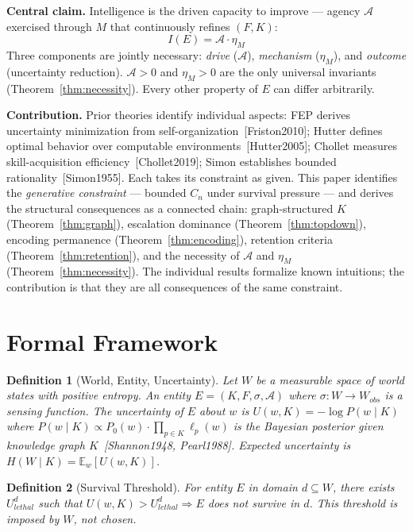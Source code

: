 \documentclass[11pt]{article}
\newtheorem{definition}{Definition}
\begin{document}
\textbf{Central claim.} Intelligence is the driven capacity to improve --- agency $\mathcal{A}$ exercised through $M$ that continuously refines $(F, K)$:
\[I(E) = \mathcal{A} \cdot \eta_M\]
Three components are jointly necessary: \emph{drive} ($\mathcal{A}$), \emph{mechanism} ($\eta_M$), and \emph{outcome} (uncertainty reduction). $\mathcal{A} > 0$ and $\eta_M > 0$ are the only universal invariants (Theorem~\ref{thm:necessity}). Every other property of $E$ can differ arbitrarily.

\textbf{Contribution.} Prior theories identify individual aspects: FEP derives uncertainty minimization from self-organization~[Friston2010]; Hutter defines optimal behavior over computable environments~[Hutter2005]; Chollet measures skill-acquisition efficiency~[Chollet2019]; Simon establishes bounded rationality~[Simon1955]. Each takes its constraint as given. This paper identifies the \emph{generative constraint} --- bounded $C_n$ under survival pressure --- and derives the structural consequences as a connected chain: graph-structured $K$ (Theorem~\ref{thm:graph}), escalation dominance (Theorem~\ref{thm:topdown}), encoding permanence (Theorem~\ref{thm:encoding}), retention criteria (Theorem~\ref{thm:retention}), and the necessity of $\mathcal{A}$ and $\eta_M$ (Theorem~\ref{thm:necessity}). The individual results formalize known intuitions; the contribution is that they are all consequences of the same constraint.

\section{Formal Framework}

\begin{definition}[World, Entity, Uncertainty]
Let $W$ be a measurable space of world states with positive entropy. An entity $E = (K, F, \sigma, \mathcal{A})$ where $\sigma : W \to W_{obs}$ is a sensing function. The uncertainty of $E$ about $w$ is $U(w, K) = -\log P(w \mid K)$ where $P(w \mid K) \propto P_0(w) \cdot \prod_{p \in K} \ell_p(w)$ is the Bayesian posterior given knowledge graph $K$~[Shannon1948, Pearl1988]. Expected uncertainty is $H(W \mid K) = \mathbb{E}_w[U(w,K)]$.
\end{definition}

\begin{definition}[Survival Threshold]
For entity $E$ in domain $d \subseteq W$, there exists $U_{lethal}^d$ such that $U(w,K) > U_{lethal}^d \Rightarrow E$ does not survive in $d$. This threshold is imposed by $W$, not chosen.
\end{definition}
\end{document}
